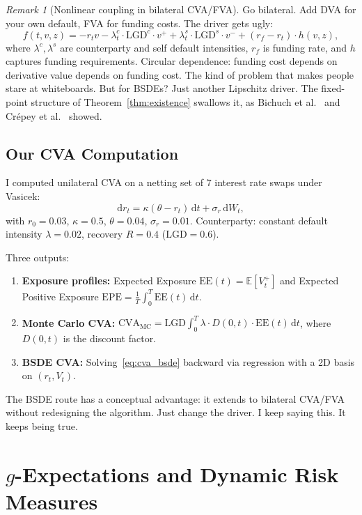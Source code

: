 \documentclass[11pt]{article}
\theoremstyle{definition}
\theoremstyle{remark}
\newtheorem{remark}[theorem]{Remark}
\newcommand{\E}{\mathbb{E}}
\newcommand{\dt}{\,\mathrm{d}t}
\newcommand{\dW}{\,\mathrm{d}W}
\begin{document}
\begin{remark}[Nonlinear coupling in bilateral CVA/FVA]
Go bilateral. Add DVA for your own default, FVA for funding costs.
The driver gets ugly:
\[
  f(t, v, z) = -r_t v - \lambda^c_t \cdot \text{LGD}^c \cdot v^+
  + \lambda^s_t \cdot \text{LGD}^s \cdot v^-
  + (r_f - r_t) \cdot h(v, z),
\]
where $\lambda^c, \lambda^s$ are counterparty and self default
intensities, $r_f$ is funding rate, and $h$ captures funding
requirements. Circular dependence: funding cost depends on derivative
value depends on funding cost. The kind of problem that makes people
stare at whiteboards. But for BSDEs?
Just another Lipschitz driver. The fixed-point structure of
Theorem~\ref{thm:existence} swallows it, as
Bichuch et al.~\cite{bichuch2018xva} and
Cr\'{e}pey et al.~\cite{crepey2014counterparty} showed.
\end{remark}

\subsection{Our CVA Computation}

I computed unilateral CVA on a netting set of $7$ interest rate swaps
under Vasicek:
\[
  \mathrm{d}r_t = \kappa(\theta - r_t)\dt + \sigma_r \dW_t,
\]
with $r_0 = 0.03$, $\kappa = 0.5$, $\theta = 0.04$, $\sigma_r = 0.01$.
Counterparty: constant default intensity $\lambda = 0.02$, recovery
$R = 0.4$ ($\text{LGD} = 0.6$).

Three outputs:
\begin{enumerate}
  \item \textbf{Exposure profiles:} Expected Exposure $\text{EE}(t) = \E[V_t^+]$
  and Expected Positive Exposure $\text{EPE} = \frac{1}{T}\int_0^T \text{EE}(t)\dt$.
  \item \textbf{Monte Carlo CVA:}
  $\text{CVA}_{\text{MC}} = \text{LGD} \int_0^T \lambda \cdot D(0,t) \cdot
  \text{EE}(t) \dt$, where $D(0,t)$ is the discount factor.
  \item \textbf{BSDE CVA:} Solving~\eqref{eq:cva_bsde} backward via
  regression with a 2D basis on $(r_t, V_t)$.
\end{enumerate}

The BSDE route has a conceptual advantage: it extends to bilateral
CVA/FVA without redesigning the algorithm. Just change the driver.
I keep saying this. It keeps being true.

\section{$g$-Expectations and Dynamic Risk Measures}\label{sec:g_expectations}
\end{document}

